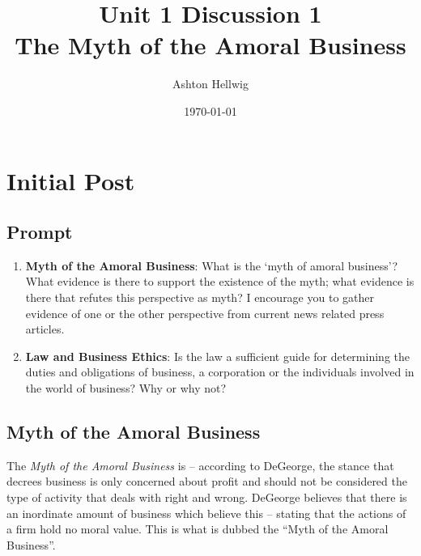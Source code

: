 \documentclass[12pt]{article}
\title{%
    Unit 1 Discussion 1\\%
    \large{The Myth of the Amoral Business}
  }
\author{Ashton Hellwig}
\date{\today}
\begin{document}
  \maketitle
  
  \section{Initial Post}
    \begin{mdframed}
      \vspace{-10pt}
      \subsection*{Prompt}
      \begin{enumerate}
        \item \textbf{Myth of the Amoral Business}: What is the ‘myth of amoral business’? What evidence is
        there to support the existence of the myth; what evidence is there that refutes this perspective as
          myth? I encourage you to gather evidence of one or the other perspective from current news related press articles.
        \item \textbf{Law and Business Ethics}: Is the law a sufficient guide for determining the duties and
          obligations of business, a corporation or the individuals involved in the world of business? Why or
          why not?
      \end{enumerate}
    \end{mdframed}
  
    \subsection{Myth of the Amoral Business}
      The \textit{Myth of the Amoral Business} is -- according to DeGeorge, the stance that
        decrees business is only concerned about profit and should not be considered the
        type of activity that deals with right and wrong. DeGeorge believes that there is
        an inordinate amount of business which believe this -- stating that the actions
        of a firm hold no moral value. This is what is dubbed the ``Myth of the Amoral Business''.
        
\end{document}
